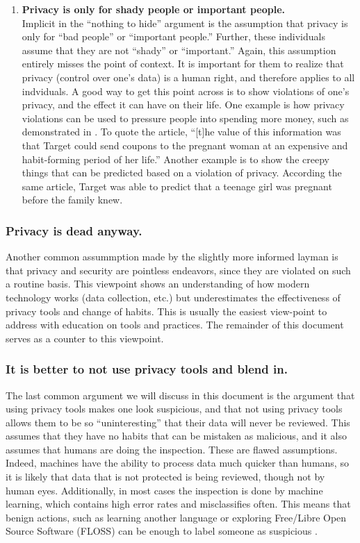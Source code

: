 \begin{enumerate}
\item \textbf{Privacy is only for shady people or important people.} \\
Implicit in the ``nothing to hide'' argument is the assumption that privacy is only for ``bad people'' or ``important people.'' Further, these individuals assume that they are not ``shady'' or ``important.'' Again, this assumption entirely misses the point of context. It is important for them to realize that privacy (control over one's data) is a human right, and therefore applies to all indviduals. A good way to get this point across is to show violations of one's privacy, and the effect it can have on their life. One example is how privacy violations can be used to pressure people into spending more money, such as demonstrated in \cite{targetpregnant}. To quote the article, ``[t]he value of this information was that Target could send coupons to the pregnant woman at an expensive and habit-forming period of her life.'' Another example is to show the creepy things that can be predicted based on a violation of privacy. According the same article, Target was able to predict that a teenage girl was pregnant before the family knew.
\end{enumerate}

\subsubsection{Privacy is dead anyway.}

Another common assummption made by the slightly more informed layman is that privacy and security are pointless endeavors, since they are violated on such a routine basis. This viewpoint shows an understanding of how modern technology works (data collection, etc.) but underestimates the effectiveness of privacy tools and change of habits. This is usually the easiest view-point to address with education on tools and practices. The remainder of this document serves as a counter to this viewpoint.

\subsubsection{It is better to not use privacy tools and blend in.}

The last common argument we will discuss in this document is the argument that using privacy tools makes one look suspicious, and that not using privacy tools allows them to be so ``uninteresting'' that their data will never be reviewed. This assumes that they have no habits that can be mistaken as malicious, and it also assumes that humans are doing the inspection. These are flawed assumptions. Indeed, machines have the ability to process data much quicker than humans, so it is likely that data that is not protected is being reviewed, though not by human eyes. Additionally, in most cases the inspection is done by machine learning, which contains high error rates and misclassifies often. This means that benign actions, such as learning another language or exploring Free/Libre Open Source Software (FLOSS) can be enough to label someone as suspicious \cite{linuxNSA}.
